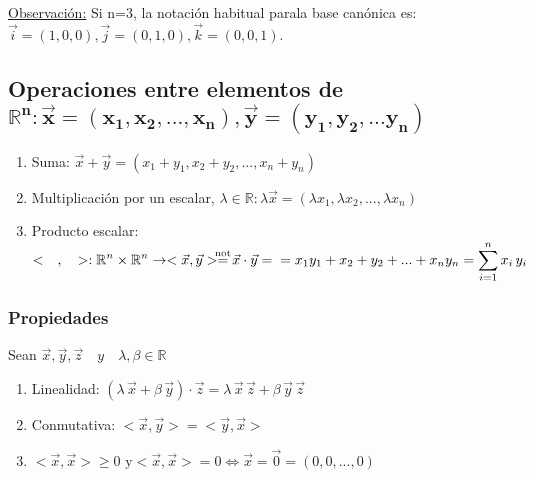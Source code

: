 \documentclass[10pt, titlepage]{article}
\newcommand{\eqc}[1]{\stackrel{\mathclap{\normalfont\mbox{\scriptsize{#1}}}}{=}}
\begin{document}
\noindent *\underline{Observación:} Si n=3, la notación habitual parala base canónica es: $\vec{i}=(1, 0, 0), \vec{j}=(0, 1, 0), \vec{k}=(0, 0, 1)$.
\vspace{3mm}


\subsection{Operaciones entre elementos de $\mathbf{\displaystyle \mathbb{R}^n : \boldsymbol{\vec{x}} 
=(x_1, x_2, ..., x_n),} \mathbf{\boldsymbol{\vec{y}}=(y_1, y_2, ... y_n)}$}
\vspace{5mm}

\begin {enumerate}

\item Suma: $\vec{x}+\vec{y}=(x_1+y_1, x_2+y_2, ..., x_n+y_n)$

\item Multiplicación por un escalar, $\lambda \in \mathbb{R}: \lambda \vec{x}=(\lambda x_1, \lambda x_2, ..., \lambda x_n)$

\item Producto escalar: $<\quad ,\quad > : \displaystyle \mathbb{R}^n \times \displaystyle \mathbb{R}^n \rightarrow <\vec{x}, \vec{y}>\displaystyle \eqc{not} \vec{x} \cdot \vec{y}= \\
=  x_1y_1+x_2+y_2+...+x_ny_n = \displaystyle \sum_{i=1}^n x_i\,y_i$

\end {enumerate}


\subsubsection*{Propiedades}
\vspace{3mm}

 Sean $\vec{x}, \vec{y}, \vec{z} \quad y \quad \lambda , \beta \in \displaystyle \mathbb{R}$

\begin{enumerate}

\item Linealidad: $(\lambda \, \vec{x} + \beta \, \vec{y}) \cdot \vec{z} = \lambda \, \vec{x} \, \vec{z} + \beta \, \vec{y} \, \vec{z}$

\item Conmutativa: $<\vec{x}, \vec{y}>=<\vec{y}, \vec{x}>$

\item $< \vec{x}, \vec{x} > \geq 0  \, \, \mathrm{y} < \vec{x}, \vec{x} > = 0 \iff \vec{x} = \vec{0} = (0, 0,..., 0)$

\end{enumerate}
\vspace{5mm}
\end{document}
